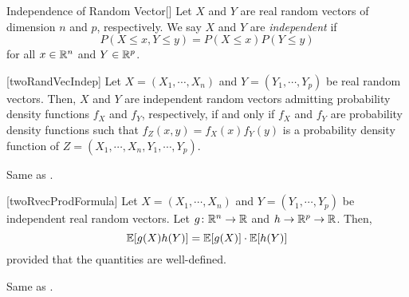 \documentclass[../probability.tex]{subfiles}
\begin{document}
\begin{Definition}{Independence of Random Vector}[]
    Let \(X\) and \(Y\) are real random vectors
    of dimension \(n\) and \(p\), respectively.
    We say \(X\) and \(Y\) are \emph{independent} if
    \[
        P(X \le x, Y \le y) = P(X \le x) P(Y \le y)
    \]
    for all \(x \in \RR[n]\) and \(Y \in \RR[p]\).
\end{Definition}

\begin{Theorem}{}[twoRandVecIndep]
    Let \(X = (X_1, \cdots, X_n)\) and \(Y = (Y_1, \cdots, Y_p)\) be real random vectors.
    Then, \(X\) and \(Y\) are independent random vectors
    admitting probability density functions \(f_X\) and \(f_Y\), respectively,
    if and only if \(f_X\) and \(f_Y\) are probability density functions
    such that \(f_Z(x, y) = f_X(x) f_Y(y)\) is a probability density function of \(Z = (X_1, \cdots,
    X_n, Y_1, \cdots, Y_p)\).
\end{Theorem}
\begin{myproof}[Proof]
    Same as .
\end{myproof}

\begin{Lemma}{}[twoRvecProdFormula]
    Let \(X = (X_1, \cdots, X_n)\) and \(Y = (Y_1, \cdots, Y_p)\) be independent real random vectors.
    Let \(g \colon \RR[n] \to \RR\) and \(h \to \RR[p] \to \RR\).
    Then,
    \[
        \mathbb{E}[g(X) h(Y)] = \mathbb{E}[g(X)] \cdot \mathbb{E}[h(Y)]
    \]
    provided that the quantities are well-defined.
\end{Lemma}
\begin{myproof}[Proof]
    Same as .
\end{myproof}
\end{document}
